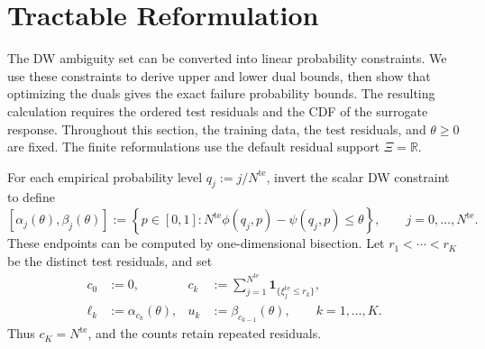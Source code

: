 \section{Tractable Reformulation}
\label{sec-reformulation}

The DW ambiguity set can be converted into linear probability constraints. We use these constraints to derive upper and lower dual bounds, then show that optimizing the duals gives the exact failure probability bounds. The resulting calculation requires the ordered test residuals and the CDF of the surrogate response. Throughout this section, the training data, the test residuals, and $\theta\ge0$ are fixed. The finite reformulations use the default residual support $\Xi=\mathbb R$.

For each empirical probability level $q_j:=j/N^{\mathrm{te}}$, invert the scalar DW constraint to define
\begin{equation}
  \left[\alpha_j(\theta),\beta_j(\theta)\right]
  :=\left\{p\in[0,1]:
  N^{\mathrm{te}}\phi\left(q_j,p\right)-\psi\left(q_j,p\right)\le\theta\right\},
  \qquad j=0,\ldots,N^{\mathrm{te}}.
  \label{eq-dw-rank-acceptance}
\end{equation}
These endpoints can be computed by one-dimensional bisection. Let $r_1<\cdots<r_K$ be the distinct test residuals, and set
\begin{equation}
  \begin{aligned}
    c_0&:=0,&
    c_k&:=\sum_{j=1}^{N^{\mathrm{te}}}\mathbf1_{\{\xi_j^{\mathrm{te}}\le r_k\}},\\
    \ell_k&:=\alpha_{c_k}(\theta),&
    u_k&:=\beta_{c_{k-1}}(\theta),\qquad k=1,\ldots,K.
  \end{aligned}
  \label{eq-dw-counts-and-levels}
\end{equation}
Thus $c_K=N^{\mathrm{te}}$, and the counts retain repeated residuals.

